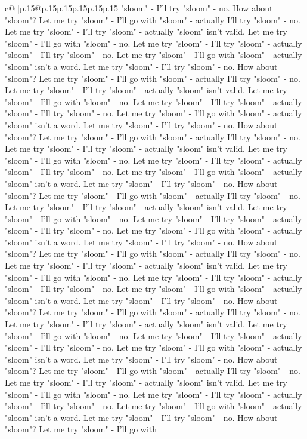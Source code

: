 \documentclass{article}
\begin{document}
{\begin{supertabular}{c@{$\;$}|p{.15\linewidth}@{}p{.15\linewidth}p{.15\linewidth}p{.15\linewidth}p{.15\linewidth}p{.15\linewidth}}
{{{"sloom" {-} I'll try "sloom" {-} no. How about "sloom"? Let me try "sloom" {-} I'll go with "sloom" {-} actually I'll try "sloom" {-} no. Let me try "sloom" {-} I'll try "sloom" {-} actually "sloom" isn't valid. Let me try "sloom" {-} I'll go with "sloom" {-} no. Let me try "sloom" {-} I'll try "sloom" {-} actually "sloom" {-} I'll try "sloom" {-} no. Let me try "sloom" {-} I'll go with "sloom" {-} actually "sloom" isn't a word. Let me try "sloom" {-} I'll try "sloom" {-} no. How about "sloom"? Let me try "sloom" {-} I'll go with "sloom" {-} actually I'll try "sloom" {-} no. Let me try "sloom" {-} I'll try "sloom" {-} actually "sloom" isn't valid. Let me try "sloom" {-} I'll go with "sloom" {-} no. Let me try "sloom" {-} I'll try "sloom" {-} actually "sloom" {-} I'll try "sloom" {-} no. Let me try "sloom" {-} I'll go with "sloom" {-} actually "sloom" isn't a word. Let me try "sloom" {-} I'll try "sloom" {-} no. How about "sloom"? Let me try "sloom" {-} I'll go with "sloom" {-} actually I'll try "sloom" {-} no. Let me try "sloom" {-} I'll try "sloom" {-} actually "sloom" isn't valid. Let me try "sloom" {-} I'll go with "sloom" {-} no. Let me try "sloom" {-} I'll try "sloom" {-} actually "sloom" {-} I'll try "sloom" {-} no. Let me try "sloom" {-} I'll go with "sloom" {-} actually "sloom" isn't a word. Let me try "sloom" {-} I'll try "sloom" {-} no. How about "sloom"? Let me try "sloom" {-} I'll go with "sloom" {-} actually I'll try "sloom" {-} no. Let me try "sloom" {-} I'll try "sloom" {-} actually "sloom" isn't valid. Let me try "sloom" {-} I'll go with "sloom" {-} no. Let me try "sloom" {-} I'll try "sloom" {-} actually "sloom" {-} I'll try "sloom" {-} no. Let me try "sloom" {-} I'll go with "sloom" {-} actually "sloom" isn't a word. Let me try "sloom" {-} I'll try "sloom" {-} no. How about "sloom"? Let me try "sloom" {-} I'll go with "sloom" {-} actually I'll try "sloom" {-} no. Let me try "sloom" {-} I'll try "sloom" {-} actually "sloom" isn't valid. Let me try "sloom" {-} I'll go with "sloom" {-} no. Let me try "sloom" {-} I'll try "sloom" {-} actually "sloom" {-} I'll try "sloom" {-} no. Let me try "sloom" {-} I'll go with "sloom" {-} actually "sloom" isn't a word. Let me try "sloom" {-} I'll try "sloom" {-} no. How about "sloom"? Let me try "sloom" {-} I'll go with "sloom" {-} actually I'll try "sloom" {-} no. Let me try "sloom" {-} I'll try "sloom" {-} actually "sloom" isn't valid. Let me try "sloom" {-} I'll go with "sloom" {-} no. Let me try "sloom" {-} I'll try "sloom" {-} actually "sloom" {-} I'll try "sloom" {-} no. Let me try "sloom" {-} I'll go with "sloom" {-} actually "sloom" isn't a word. Let me try "sloom" {-} I'll try "sloom" {-} no. How about "sloom"? Let me try "sloom" {-} I'll go with "sloom" {-} actually I'll try "sloom" {-} no. Let me try "sloom" {-} I'll try "sloom" {-} actually "sloom" isn't valid. Let me try "sloom" {-} I'll go with "sloom" {-} no. Let me try "sloom" {-} I'll try "sloom" {-} actually "sloom" {-} I'll try "sloom" {-} no. Let me try "sloom" {-} I'll go with "sloom" {-} actually "sloom" isn't a word. Let me try "sloom" {-} I'll try "sloom" {-} no. How about "sloom"? Let me try "sloom" {-} I'll go with }}}
\end{supertabular}}
\end{document}

